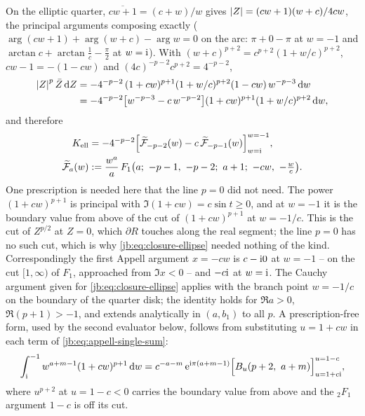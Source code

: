 On the elliptic quarter, $\overline{c w + 1} = (c + w) / w$ gives ${|Z|} = (c w + 1)(w + c) /
4 c w$, the principal arguments composing exactly ($\arg(c w + 1) + \arg(w + c) - \arg w = 0$ on
the arc: $\pi + 0 - \pi$ at $w = -1$ and $\arctan c + \arctan \tfrac1c - \tfrac{\pi}{2}$ at
$w = \mathrm{i}$).
With $(w + c)^{p + 2} = c^{p + 2} (1 + w / c)^{p + 2}$, $c w - 1 = - (1 - c w)$ and
$(4 c)^{-p - 2} c^{p + 2} = 4^{-p - 2}$,
\begin{equation}
  \label{jb:eq:closure-ellipse-integrand-q-zero}
  \begin{aligned}
    {|Z|}^{p} \, \bar Z \, \mathrm{d} Z
      &
      = - 4^{-p - 2} \, (1 + c w)^{p + 1} (1 + w / c)^{p + 2} (1 - c w) \, w^{-p - 3} \, \mathrm{d} w
      \\
      &
      = - 4^{-p - 2} \bigl[ w^{-p - 3} - c \, w^{-p - 2} \bigr]
        (1 + c w)^{p + 1} (1 + w / c)^{p + 2} \, \mathrm{d} w,
  \end{aligned}
\end{equation}
and therefore
\begin{equation}
  \label{jb:eq:closure-ellipse-q-zero}
  \begin{aligned}
    K_{\text{ell}}
      &
      = - 4^{-p - 2}
        \Bigl[ \widetilde{\mc F}_{-p - 2}(w) - c \, \widetilde{\mc F}_{-p - 1}(w) \Bigr]_{w = \I}^{w = -1},
    \\
    \widetilde{\mc F}_a(w)
      &
      := \frac{w^a}{a} \, F_1 \bigl( a; \ - p - 1, \ - p - 2; \ a + 1; \ - c w, \ - \tfrac{w}{c} \bigr) .
  \end{aligned}
\end{equation}
One prescription is needed here that the line $p = 0$ did not need.
The power $(1 + c w)^{p + 1}$ is principal with $\Im(1 + c w) = c \sin t \ge 0$, and at $w = -1$ it
is the boundary value from above of the cut of $(1 + c w)^{p + 1}$ at $w = - 1/c$.
This is the cut of $Z^{p/2}$ at $Z = 0$, which $\partial R$ touches along the real segment; the
line $p = 0$ has no such cut, which is why \eqref{jb:eq:closure-ellipse} needed nothing of the kind.
Correspondingly the first Appell argument $x = - c w$ is $c - \mathrm{i} 0$ at $w = -1$ -- on the cut
$[1, \infty)$ of $F_1$, approached from $\Im x < 0$ -- and $- c \mathrm{i}$ at $w = \mathrm{i}$.
The Cauchy argument given for \eqref{jb:eq:closure-ellipse} applies with the branch point $w = - 1/c$
on the boundary of the quarter disk; the identity holds for $\Re a > 0$, $\Re (p + 1) > -1$, and
extends analytically in $(a, b_1)$ to all $p$.
A prescription-free form, used by the second evaluator below, follows from substituting
$u = 1 + c w$ in each term of \eqref{jb:eq:appell-single-sum}:
\begin{equation}
  \label{jb:eq:closure-ellipse-q-zero-u}
  \int_{\mathrm{i}}^{-1} w^{a + m - 1} (1 + c w)^{p + 1} \, \mathrm{d} w
    = c^{-a - m} \, \mathrm{e}^{\mathrm{i} \pi (a + m - 1)}
      \Bigl[ B_u (p + 2, \ a + m) \Bigr]_{u = 1 + c \mathrm{i}}^{u = 1 - c},
\end{equation}
where $u^{p + 2}$ at $u = 1 - c < 0$ carries the boundary value from above and the ${}_2F_1$
argument $1 - c$ is off its cut.

